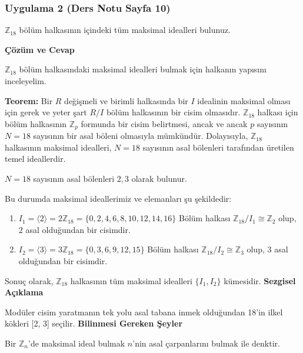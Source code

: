 \documentclass[11pt, a4paper]{article}
\newenvironment{cozum}{
    \vspace{0.5cm}
    \noindent\textcolor{green!60!black}{\faCheckCircle\enspace \textbf{\Large Çözüm ve Cevap}}\par\vspace{0.2cm}
}{}
\newenvironment{sezgisel}{
    \vspace{0.5cm}
    \noindent\textcolor{orange!80!black}{\faLightbulb\enspace \textbf{\Large Sezgisel Açıklama}}\par\vspace{0.2cm}
    \itshape
}{}
\newenvironment{bilgi}{
    \vspace{0.5cm}
    \noindent\textcolor{red!70!black}{\faExclamationTriangle\enspace \textbf{\Large Bilinmesi Gereken Şeyler}}\par\vspace{0.2cm}
}{}
\begin{document}
\subsubsection{Uygulama 2 (Ders Notu Sayfa 10)}
\begin{sorubox}
$\mathbb{Z}_{18}$ bölüm halkasının içindeki tüm maksimal idealleri bulunuz.
\end{sorubox}
\begin{cozum}
$\mathbb{Z}_{18}$ bölüm halkasındaki maksimal idealleri bulmak için halkanın yapısını inceleyelim.

\textbf{Teorem:} Bir $R$ değişmeli ve birimli halkasında bir $I$ idealinin maksimal olması için gerek ve yeter şart $R/I$ bölüm halkasının bir cisim olmasıdır. $\mathbb{Z}_{18}$ halkası için bölüm halkasının $\mathbb{Z}_p$ formunda bir cisim belirtmesi, ancak ve ancak $p$ sayısının $N = 18$ sayısının bir asal böleni olmasıyla mümkündür. Dolayısıyla, $\mathbb{Z}_{18}$ halkasının maksimal idealleri, $N = 18$ sayısının asal bölenleri tarafından üretilen temel ideallerdir.

$N = 18$ sayısının asal bölenleri $2, 3$ olarak bulunur.

Bu durumda maksimal ideallerimiz ve elemanları şu şekildedir:
\begin{enumerate}
    \item $I_{1} = \langle 2 \rangle = 2\mathbb{Z}_{18} = \{0, 2, 4, 6, 8, 10, 12, 14, 16\}$
    Bölüm halkası $\mathbb{Z}_{18} / I_{1} \cong \mathbb{Z}_{2}$ olup, $2$ asal olduğundan bir cisimdir.
    \item $I_{2} = \langle 3 \rangle = 3\mathbb{Z}_{18} = \{0, 3, 6, 9, 12, 15\}$
    Bölüm halkası $\mathbb{Z}_{18} / I_{2} \cong \mathbb{Z}_{3}$ olup, $3$ asal olduğundan bir cisimdir.
\end{enumerate}

Sonuç olarak, $\mathbb{Z}_{18}$ halkasının tüm maksimal idealleri $\{I_1, I_2\}$ kümesidir.
\end{cozum}
\begin{sezgisel}
Modüler cisim yaratmanın tek yolu asal tabana inmek olduğundan 18'in ilkel kökleri [2, 3] seçilir.
\end{sezgisel}
\begin{bilgi}
Bir $\mathbb{Z}_n$'de maksimal ideal bulmak $n$'nin asal çarpanlarını bulmak ile denktir.
\end{bilgi}

\newpage
\end{document}
